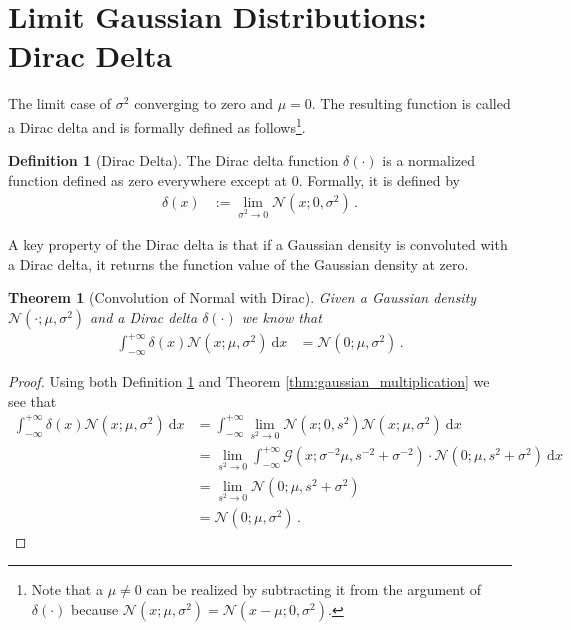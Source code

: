 \documentclass[a4paper]{article}
\newcommand{\Normal}[3]{{\mathcal N} \left({#1};{#2},{#3}\right)}
\newcommand{\Gauss}[3]{{\mathcal G} \left({#1};{#2},{#3}\right)}
\newcommand{\dirac}[1]{{\delta \left( {#1} \right)}}
\newcommand{\intd}[1]{\ \mathrm{d}{#1}}
\newtheorem{theorem}{Theorem}
\theoremstyle{definition}
\newtheorem{definition}{Definition}
\begin{document}
\section*{Limit Gaussian Distributions: Dirac Delta} 
The limit case of $\sigma^2$ converging to zero and $\mu = 0$. The resulting function is called a Dirac delta and is formally defined as follows\footnote{Note that a $\mu \not= 0$ can be realized by subtracting it from the argument of $\dirac{\cdot}$ because $\Normal{x}{\mu}{\sigma^2} = \Normal{x - \mu}{0}{\sigma^2}$.}.
\begin{definition}[Dirac Delta] \label{def:dirac}
    The Dirac delta function $\dirac{\cdot}$ is a normalized function defined as zero everywhere except at $0$. Formally, it is defined by
    \begin{align}
        \dirac{x} & := \lim_{\sigma^2 \rightarrow 0} \Normal{x}{0}{\sigma^2} \,.
    \end{align}
\end{definition}
A key property of the Dirac delta is that if a Gaussian density is convoluted with a Dirac delta, it returns the function value of the Gaussian density at zero.
\begin{theorem}[Convolution of Normal with Dirac] \label{thm:dirac_convolution}
    Given a Gaussian density $\Normal{\cdot}{\mu}{\sigma^2}$ and a Dirac delta $\dirac{\cdot}$ we know that
    \begin{align}
        \int_{-\infty}^{+\infty} \dirac{x}\Normal{x}{\mu}{\sigma^2}\intd{x} & = \Normal{0}{\mu}{\sigma^2}\,.
    \end{align}
\end{theorem}

\begin{proof}\label{prf:dirac_convolution}
    Using both Definition \ref{def:dirac} and Theorem \ref{thm:gaussian_multiplication} we see that
    \begin{align*}
        \int_{-\infty}^{+\infty} \dirac{x}\Normal{x}{\mu}{\sigma^2}\intd{x} 
         & = \int_{-\infty}^{+\infty} \lim_{s^2 \rightarrow 0} \Normal{x}{0}{s^2} \Normal{x}{\mu}{\sigma^2}\intd{x} \\
         & = \lim_{s^2 \rightarrow 0} \int_{-\infty}^{+\infty} \Gauss{x}{\sigma^{-2}\mu}{s^{-2}+\sigma^{-2}} \cdot \Normal{0}{\mu}{s^2 + \sigma^2}\intd{x} \\
         & = \lim_{s^2 \rightarrow 0} \Normal{0}{\mu}{s^2 + \sigma^2} \\
         & = \Normal{0}{\mu}{\sigma^2}\,.
    \end{align*}
\end{proof}
\end{document}
